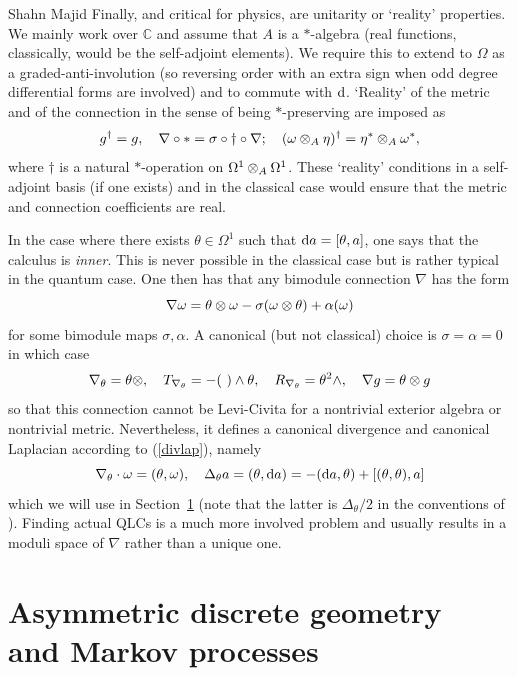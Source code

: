 \begin{artengenv}{Shahn Majid}
Finally, and critical for physics, are unitarity or `reality' properties. We mainly work over $\mathbb{C}$ and assume that $A$ is a $*$-algebra (real functions, classically, would be the self-adjoint elements). We require this to extend to $\Omega$ as a graded-anti-involution (so reversing order with an extra sign when odd degree differential forms are involved) and to commute with ${\rm d}$. `Reality' of the metric and of the connection in the sense of being $*$-preserving are imposed as \parencite{BegMa:gra,BegMa:spe}
\begin{equation}\label{realgnab} g^\dagger=g,\quad \nabla\circ *= \sigma\circ\dagger\circ \nabla;\quad (\omega \tens_A\eta)^\dagger=\eta^*\tens_A \omega^*,\end{equation} where $\dagger$ is a natural $*$-operation on $\Omega^1\otimes_A\Omega^1$. These `reality' conditions in a self-adjoint basis (if one exists) and in the classical case would ensure that the metric and connection coefficients are real.

In the case where there exists $\theta\in \Omega^1$ such that ${\rm d} a=[\theta,a]$, one says that the calculus is {\em inner}. This is never possible in the classical case but is rather typical in the quantum case. One then has that
any bimodule connection $\nabla$ has the form \parencite{Ma:gra}
\[ \nabla \omega= \theta\otimes\omega-\sigma(\omega\otimes\theta)+\alpha(\omega)\]
for some bimodule maps $\sigma,\alpha$. A canonical (but not classical) choice is $\sigma=\alpha=0$ in which
case
\[ \nabla_\theta= \theta\otimes,\quad T_{\nabla_\theta}=-(\ )\wedge\theta,\quad R_{\nabla_\theta}=\theta^2\wedge,\quad \nabla g=\theta\otimes g \]
so that this connection cannot be Levi-Civita for a nontrivial exterior algebra or nontrivial metric. Nevertheless, it defines a canonical divergence and canonical Laplacian according to (\ref{divlap}), namely
\[ \nabla_\theta\cdot\omega=(\theta,\omega),\quad \Delta_\theta a= (\theta,{\rm d} a)= -({\rm d} a,\theta)+[(\theta,\theta),a]\]
which we will use in Section~\ref{secmarkov} (note that the latter is $\Delta_\theta/2$ in the conventions of \parencite{Ma:gra,BegMa}). Finding actual QLCs is a much more involved problem and usually results in a moduli space of $\nabla$ rather than a unique one. 

\section{Asymmetric discrete geometry\\and Markov processes}\label{secmarkov}


\end{artengenv}
